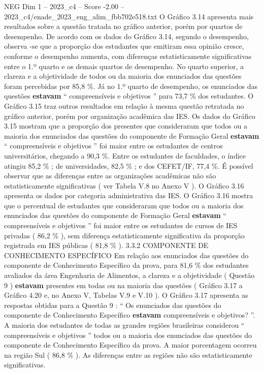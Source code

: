 \begin{textsample}{NEG Dim 1 – 2023\_c4 – Score -2.00 – 2023\_c4/enade\_2023\_eng\_alim\_fbb702e518.txt}
O Gráfico 3.14 apresenta mais resultados sobre a questão tratada no gráfico anterior, porém por quartos de desempenho.
De acordo com os dados do Gráfico 3.14, segundo o desempenho, observa -se que a proporção dos estudantes que emitiram essa opinião cresce, conforme o desempenho aumenta, com diferenças estatisticamente significativas entre o 1.º quarto e os demais quartos de desempenho.
No quarto superior, a clareza e a objetividade de todos ou da maioria dos enunciados das questões foram percebidas por 85,8 \%.
Já no 1.º quarto de desempenho, os enunciados das questões \textbf{estavam} “ compreensíveis e objetivos ” para 73,7 \% dos estudantes.
O Gráfico 3.15 traz outros resultados em relação à mesma questão retratada no gráfico anterior, porém por organização acadêmica das IES.
Os dados do Gráfico 3.15 mostram que a proporção dos presentes que consideraram que todos ou a maioria dos enunciados das questões do componente de Formação Geral \textbf{estavam} “ compreensíveis e objetivos ” foi maior entre os estudantes de centros universitários, chegando a 90,3 \%.
Entre os estudantes de faculdades, o índice atingiu 85,2 \% ; de universidades, 82,5 \% ; e dos CEFET/IF, 77,4 \%.
É possível observar que as diferenças entre as organizações acadêmicas não são estatisticamente significativas ( ver Tabela V.8 no Anexo V ).
O Gráfico 3.16 apresenta os dados por categoria administrativa das IES.
O Gráfico 3.16 mostra que o percentual de estudantes que consideraram que todos ou a maioria dos enunciados das questões do componente de Formação Geral \textbf{estavam} “ compreensíveis e objetivos ” foi maior entre os estudantes de cursos de IES privadas ( 86,2 \% ), sem diferença estatisticamente significativa da proporção registrada em IES públicas ( 81,8 \% ). 3.3.2 COMPONENTE DE CONHECIMENTO ESPECÍFICO Em relação aos enunciados das questões do componente de Conhecimento Específico da prova, para 81,6 \% dos estudantes avaliados da área Engenharia de Alimentos, a clareza e a objetividade ( Questão 9 ) \textbf{estavam} presentes em todas ou na maioria das questões ( Gráfico 3.17 a Gráfico 4.20 e, no Anexo V, Tabelas V.9 e V.10 ).
O Gráfico 3.17 apresenta as respostas obtidas para a Questão 9 : “ Os enunciados das questões do componente de Conhecimento Específico \textbf{estavam} compreensíveis e objetivos? ”.
A maioria dos estudantes de todas as grandes regiões brasileiras considerou “ compreensíveis e objetivos ” todos ou a maioria dos enunciados das questões do componente de Conhecimento Específico da prova.
A maior porcentagem ocorreu na região Sul ( 86,8 \% ).
As diferenças entre as regiões não são estatisticamente significativas.

\end{textsample}
